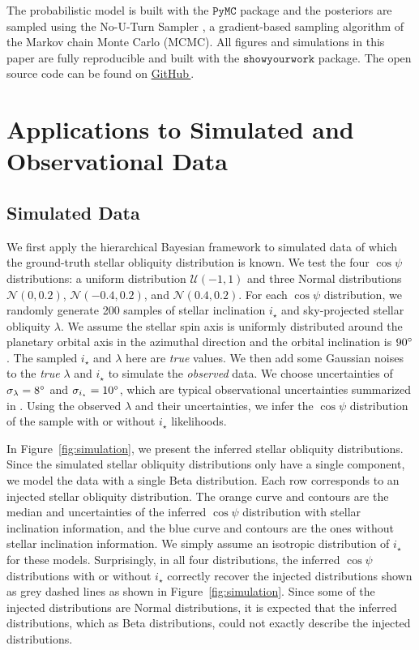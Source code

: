 \documentclass[twocolumn,times]{aastex631}
\begin{document}
The probabilistic model is built with the $\mathtt{PyMC}$ \citep[$\mathtt{v4.1.7}$;][]{pymc} package and the posteriors are sampled using the No-U-Turn Sampler \citep[NUTS;][]{Hoffman11}, a gradient-based sampling algorithm of the Markov chain Monte Carlo (MCMC). All figures and simulations in this paper are fully reproducible and built with the $\mathtt{showyourwork}$ package. The open source code can be found on \href{https://github.com/jiayindong/polar}{GitHub\,\faGithub}.

\section{Applications to Simulated and Observational Data}\label{sec:applications}

\subsection{Simulated Data}

We first apply the hierarchical Bayesian framework to simulated data of which the ground-truth stellar obliquity distribution is known. We test the four $\cos{\psi}$ distributions: a uniform distribution $\mathcal{U}(-1,1)$ and three Normal distributions $\mathcal{N}(0,0.2)$, $\mathcal{N}(-0.4,0.2)$, and $\mathcal{N}(0.4,0.2)$.
For each $\cos{\psi}$ distribution, we randomly generate 200 samples of stellar inclination $i_\star$ and sky-projected stellar obliquity $\lambda$. We assume the stellar spin axis is uniformly distributed around the planetary orbital axis in the azimuthal direction and the orbital inclination is $90\mbox{$^\circ$}$. 
The sampled $i_\star$ and $\lambda$ here are \emph{true} values. We then add some Gaussian noises to the \emph{true} $\lambda$ and $i_\star$ to simulate the \emph{observed} data. We choose uncertainties of $\sigma_{\lambda} = 8\mbox{$^\circ$}$ and $\sigma_{i_\star} = 10\mbox{$^\circ$}$, which are typical observational uncertainties summarized in \cite{Albrecht22}. Using the observed $\lambda$ and their uncertainties, we infer the $\cos{\psi}$ distribution of the sample with or without $i_\star$ likelihoods. 

In Figure~\ref{fig:simulation}, we present the inferred stellar obliquity distributions. Since the simulated stellar obliquity distributions only have a single component, we model the data with a single Beta distribution. Each row corresponds to an injected stellar obliquity distribution. The orange curve and contours are the median and uncertainties of the inferred $\cos{\psi}$ distribution with stellar inclination information, and the blue curve and contours are the ones without stellar inclination information. We simply assume an isotropic distribution of $i_\star$ for these models.
Surprisingly, in all four distributions, the inferred $\cos{\psi}$ distributions with or without $i_\star$ correctly recover the injected distributions shown as grey dashed lines as shown in Figure~\ref{fig:simulation}. Since some of the injected distributions are Normal distributions, it is expected that the inferred distributions, which as Beta distributions, could not exactly describe the injected distributions.
\end{document}
